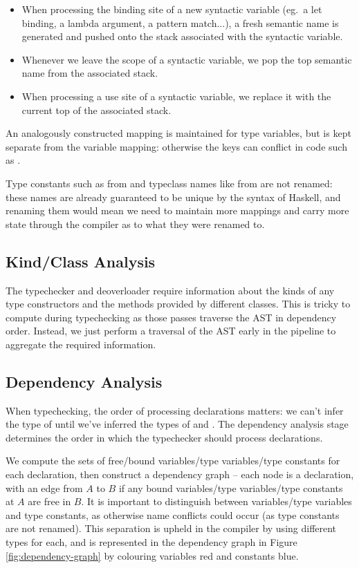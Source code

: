 \documentclass[dissertation.tex]{subfiles}
\begin{document}
{{        \begin{itemize}
        \item When processing the binding site of a new syntactic variable (eg.\ a let binding, a lambda argument, a pattern match...), a fresh semantic name is generated and pushed onto the stack associated with the syntactic variable.
        \item Whenever we leave the scope of a syntactic variable, we pop the top semantic name from the associated stack.
        \item When processing a use site of a syntactic variable, we replace it with the current top of the associated stack.
        \end{itemize}

        An analogously constructed mapping is maintained for type variables, but is kept separate from the variable mapping: otherwise the keys can conflict in code such as .

        Type constants such as  from  and typeclass names like  from  are not renamed: these names are already guaranteed to be unique by the syntax of Haskell, and renaming them would mean we need to maintain more mappings and carry more state through the compiler as to what they were renamed to.
    }
    \subsection{Kind/Class Analysis}
    {
        The typechecker and deoverloader require information about the kinds of any type constructors and the methods provided by different classes. This is tricky to compute during typechecking as those passes traverse the AST in dependency order. Instead, we just perform a traversal of the AST early in the pipeline to aggregate the required information. 
    }
    \subsection{Dependency Analysis}\label{sec:dependency-analysis}
    {
        When typechecking, the order of processing declarations matters: we can't infer the type of  until we've inferred the types of  and . The dependency analysis stage determines the order in which the typechecker should process declarations. 

        We compute the sets of free/bound variables/type variables/type constants for each declaration, then construct a dependency graph -- each node is a declaration, with an edge from \(A\) to \(B\) if any bound variables/type variables/type constants at \(A\) are free in \(B\). It is important to distinguish between variables/type variables and type constants, as otherwise name conflicts could occur (as type constants are not renamed). This separation is upheld in the compiler by using different types for each, and is represented in the dependency graph in Figure \ref{fig:dependency-graph} by colouring variables red and constants blue.

}}
\end{document}
